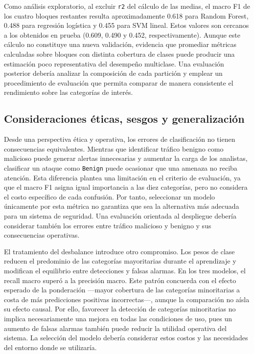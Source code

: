 \documentclass[conference]{IEEEtran}
\begin{document}
Como análisis exploratorio, al excluir \texttt{r2} del cálculo de las medias, el macro F1 de los cuatro bloques restantes resulta aproximadamente 0.618 para Random Forest, 0.488 para regresión logística y 0.455 para SVM lineal. Estos valores son cercanos a los obtenidos en prueba (0.609, 0.490 y 0.452, respectivamente). Aunque este cálculo no constituye una nueva validación, evidencia que promediar métricas calculadas sobre bloques con distinta cobertura de clases puede producir una estimación poco representativa del desempeño multiclase. Una evaluación posterior debería analizar la composición de cada partición y emplear un procedimiento de evaluación que permita comparar de manera consistente el rendimiento sobre las categorías de interés.

\subsection{Consideraciones éticas, sesgos y generalización}

Desde una perspectiva ética y operativa, los errores de clasificación no tienen consecuencias equivalentes. Mientras que identificar tráfico benigno como malicioso puede generar alertas innecesarias y aumentar la carga de los analistas, clasificar un ataque como \texttt{Benign} puede ocasionar que una amenaza no reciba atención. Esta diferencia plantea una limitación en el criterio de evaluación, ya que el macro F1 asigna igual importancia a las diez categorías, pero no considera el costo específico de cada confusión. Por tanto, seleccionar un modelo únicamente por esta métrica no garantiza que sea la alternativa más adecuada para un sistema de seguridad. Una evaluación orientada al despliegue debería considerar también los errores entre tráfico malicioso y benigno y sus consecuencias operativas.

El tratamiento del desbalance introduce otro compromiso. Los pesos de clase reducen el predominio de las categorías mayoritarias durante el aprendizaje y modifican el equilibrio entre detecciones y falsas alarmas. En los tres modelos, el recall macro superó a la precisión macro. Este patrón concuerda con el efecto esperado de la ponderación —mayor cobertura de las categorías minoritarias a costa de más predicciones positivas incorrectas—, aunque la comparación no aísla su efecto causal. Por ello, favorecer la detección de categorías minoritarias no implica necesariamente una mejora en todas las condiciones de uso, pues un aumento de falsas alarmas también puede reducir la utilidad operativa del sistema. La selección del modelo debería considerar estos costos y las necesidades del entorno donde se utilizaría.
\end{document}
